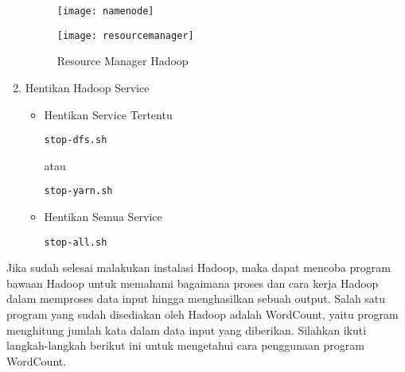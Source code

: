 \documentclass[a4paper]{tufte-handout}
\begin{document}
\begin{enumerate}
\begin{figure}[!ht]
\texttt{[image: namenode]}
\label{gam:namenode}
\end{figure}
\vspace*{-.7cm}
\begin{figure}[!ht]
\texttt{[image: resourcemanager]}
\caption{Resource Manager Hadoop}
\label{gam:resourcemanager}
\end{figure}

\vspace*{-.7cm}
\item Hentikan Hadoop Service
\begin{itemize}
\item Hentikan Service Tertentu
\begin{lstlisting}[language=Terminal]
 stop-dfs.sh
\end{lstlisting} 
atau
\begin{lstlisting}[language=Terminal]
 stop-yarn.sh
\end{lstlisting}
 
\item Hentikan Semua Service
\begin{lstlisting}[language=Terminal]
 stop-all.sh
\end{lstlisting}
\end{itemize}
\end{enumerate}

\vspace*{.1cm}


\hrulefill

\clearpage
{}

Jika sudah selesai malakukan instalasi Hadoop, maka dapat mencoba program bawaan Hadoop untuk memahami bagaimana proses dan cara kerja Hadoop dalam memproses data input hingga menghasilkan sebuah output. Salah satu program yang sudah disediakan oleh Hadoop adalah WordCount, yaitu program menghitung jumlah kata dalam data input yang diberikan. Silahkan ikuti langkah-langkah berikut ini untuk mengetahui cara penggunaan program WordCount.
\end{document}
